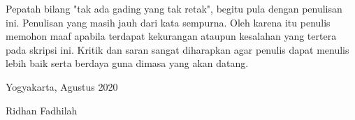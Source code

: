 Pepatah bilang "tak ada gading yang tak retak", begitu pula dengan penulisan ini. Penulisan yang masih jauh dari kata sempurna. Oleh karena itu penulis memohon maaf apabila terdapat kekurangan ataupun kesalahan yang tertera pada skripsi ini. Kritik dan saran sangat diharapkan agar penulis dapat menulis lebih baik serta berdaya guna dimasa yang akan datang.
\newline

\begin{flushright}
Yogyakarta, Agustus 2020
\end{flushright}
\vspace{0.5cm}
\begin{flushright}
Ridhan Fadhilah
\end{flushright}